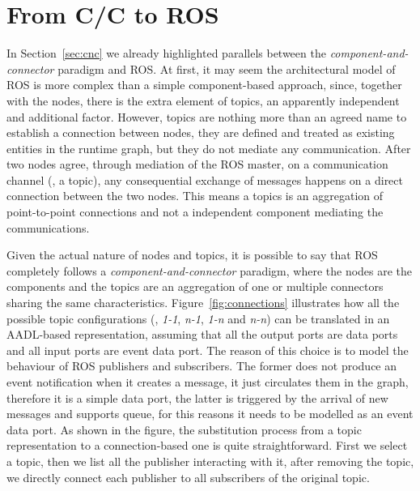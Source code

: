 \section{From C/C to ROS}
\label{sec:cnc-ros}
In Section~\ref{sec:cnc} we already highlighted parallels between the \textit{component-and-connector} paradigm and ROS. At first, it may seem the architectural model of ROS is more complex than a simple component-based approach, since, together with the nodes, there is the extra element of topics, an apparently independent and additional factor. However, topics are nothing more than an agreed name to establish a connection between nodes, they are defined and treated as existing entities in the runtime graph, but they do not mediate any communication. After two nodes agree, through mediation of the ROS master, on a communication channel (\ie, a topic), any consequential exchange of messages happens on a direct connection between the two nodes. This means a topics is an aggregation of point-to-point connections and not a independent component mediating the communications. 

Given the actual nature of nodes and topics, it is possible to say that ROS completely follows a \textit{component-and-connector} paradigm, where the nodes are the components and the topics are an aggregation of one or multiple connectors sharing the same characteristics. Figure~\ref{fig:connections} illustrates how all the possible topic configurations (\ie, \textit{1-1}, \textit{n-1}, \textit{1-n} and \textit{n-n}) can be translated in an AADL-based representation, assuming that all the output ports are data ports and all input ports are event data port. The reason of this choice is to model the behaviour of ROS publishers and subscribers. The former does not produce an event notification when it creates a message, it just circulates them in the graph, therefore it is a simple data port, the latter is triggered by the arrival of new messages and supports queue, for this reasons it needs to be modelled as an event data port. As shown in the figure, the substitution process from a topic representation to a connection-based one is quite straightforward. First we select a topic, then we list all the publisher interacting with it, after removing the topic, we directly connect each publisher to all subscribers of the original topic. 

